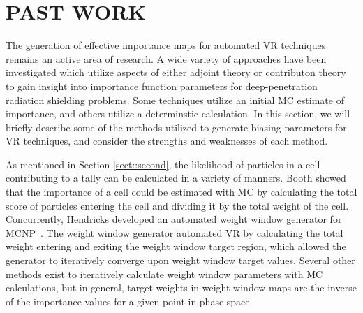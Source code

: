 \documentclass[12pt]{article}
\begin{document}


\section{PAST WORK}
\label{sect::past}

The generation of effective importance maps for automated VR techniques remains an active area of research. A wide variety of approaches have been investigated which utilize aspects of either adjoint theory or contributon theory to gain insight into importance function parameters for deep-penetration radiation shielding problems. Some techniques utilize an initial MC estimate of importance, and others utilize a determinstic calculation. In this section, we will briefly describe some of the methods utilized to generate biasing parameters for VR techniques, and consider the strengths and weaknesses of each method.

As mentioned in Section \ref{sect::second}, the likelihood of particles in a cell contributing to a tally can be calculated in a variety of manners. Booth \cite{booth_automatic_1982} showed that the importance of a cell could be estimated with MC by calculating the total score of particles entering the cell and dividing it by the total weight of the cell. Concurrently, Hendricks \cite{hendricks_code-generated_1982} developed an automated weight window generator for MCNP~\cite{brown_mcnp_2002}. The weight window generator automated VR by calculating the total weight entering and exiting the weight window target region, which allowed the generator to iteratively converge upon weight window target values. Several other methods exist to iteratively calculate weight window parameters with MC calculations, but in general, target weights in weight window maps are the inverse of the importance values for a given point in phase space.
\end{document}
